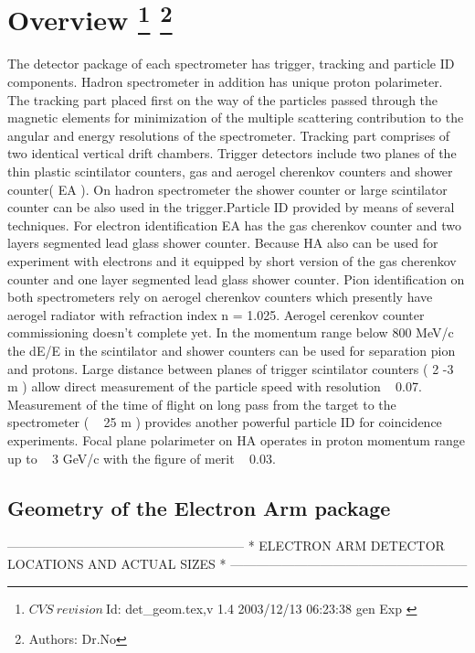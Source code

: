 \section[Overview]{Overview
\footnote{
  $CVS~revision~ $Id: det_geom.tex,v 1.4 2003/12/13 06:23:38 gen Exp $ $
}
\footnote{Authors: Dr.No }
}

        The detector package of each spectrometer has trigger, tracking and particle 
ID components. Hadron spectrometer in addition has unique proton polarimeter. The 
tracking part placed first on the way of the particles passed through the magnetic 
elements for minimization of the multiple scattering contribution to the angular and 
energy resolutions of the spectrometer. Tracking part comprises of 
two identical vertical drift chambers. Trigger detectors include two planes of the
thin plastic scintilator counters, gas and aerogel cherenkov counters and shower 
counter( EA ). On hadron spectrometer the shower counter or large scintilator counter 
can be also used in the trigger.Particle ID provided by means of several techniques. 
For electron identification EA has the gas cherenkov counter and two layers segmented 
lead glass shower counter. Because HA also can be used for experiment with electrons 
and it equipped by short version of the gas cherenkov counter and one layer segmented 
lead glass shower counter. Pion identification on both spectrometers rely on aerogel 
cherenkov counters which presently have aerogel radiator with refraction index n = 1.025. 
Aerogel cerenkov counter commissioning doesn't complete yet. In the momentum range 
below 800 MeV/c the dE/E in the scintilator and shower counters can be used for 
separation pion and protons. Large distance between planes of trigger scintilator 
counters ( 2 -3 m ) allow direct measurement of the particle speed with resolution 
~ 0.07. Measurement of the time of flight on long pass from the target to the 
spectrometer ( ~ 25 m ) provides another powerful particle ID for coincidence experiments.
Focal plane polarimeter on HA operates in proton momentum range up to ~ 3 GeV/c with 
the figure of merit ~ 0.03.

\subsection{Geometry of the Electron Arm package}

          --------------------------------------------------------
          *   ELECTRON ARM DETECTOR LOCATIONS AND ACTUAL SIZES   *
          --------------------------------------------------------

